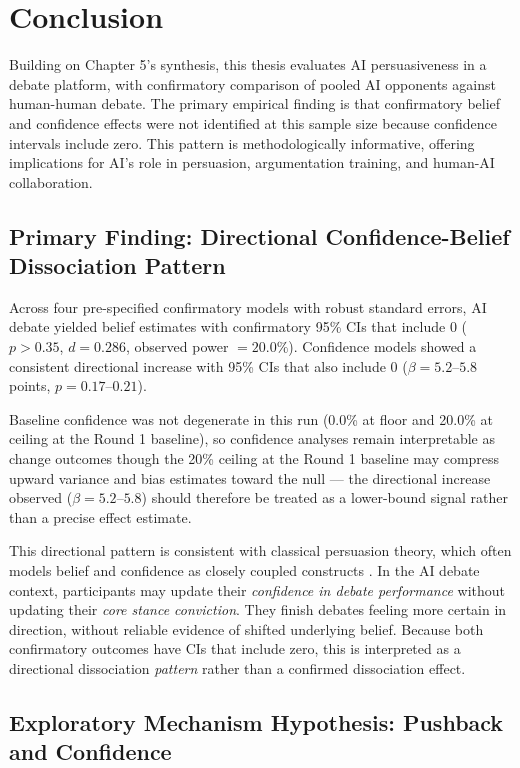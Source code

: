 \section{Conclusion}

Building on Chapter 5's synthesis, this thesis evaluates AI persuasiveness in a debate platform,
with confirmatory comparison of pooled AI opponents against human-human debate.
The primary empirical finding is that confirmatory belief and confidence effects were not identified
at this sample size because confidence intervals include zero. This pattern is
methodologically informative,
offering implications for AI's role in persuasion, argumentation training, and human-AI collaboration.

\subsection{Primary Finding: Directional Confidence-Belief Dissociation Pattern}

Across four pre-specified confirmatory models with robust standard errors,
AI debate yielded belief estimates with confirmatory 95\% CIs that include 0
($p > 0.35$, $d = 0.286$, observed power $= 20.0\%$).
Confidence models showed a consistent directional increase with 95\% CIs that also include 0
($\beta = 5.2$--$5.8$ points, $p = 0.17$--$0.21$).

Baseline confidence was not degenerate in this run (0.0\% at floor and 20.0\% at ceiling at the Round 1 baseline),
so confidence analyses remain interpretable as change outcomes though the 20\% ceiling at the Round 1 baseline may compress
upward variance and bias estimates toward the null — the directional increase observed ($\beta = 5.2$--$5.8$) should therefore be
treated as a lower-bound signal rather than a precise effect estimate.

This directional pattern is consistent with classical persuasion theory, which often models belief and
confidence as closely coupled constructs \cite{petty1986_elm,eagly1993_psychology_of_attitudes}.
In the AI debate context, participants may update their \textit{confidence in debate performance}
without updating their \textit{core stance conviction}. They finish debates feeling more certain
in direction, without reliable evidence of shifted underlying belief. Because both confirmatory
outcomes have CIs that include zero, this is interpreted as a directional dissociation \textit{pattern}
rather than a confirmed dissociation effect.

\subsection{Exploratory Mechanism Hypothesis: Pushback and Confidence}

